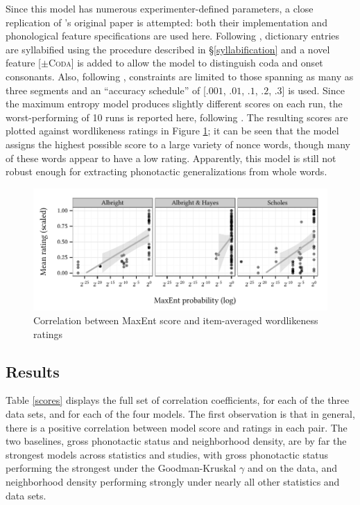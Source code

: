 Since this model has numerous experimenter-defined parameters, a close replication of \citeauthor{Hayes2008a}'s original paper is attempted: both their implementation and phonological feature specifications are used here.
Following \citet{HayesInPress}, dictionary entries are syllabified using the procedure described in \S\ref{syllabification} and a novel feature [$\pm$\textsc{Coda}] is added to allow the model to distinguish coda and onset consonants.
Also, following \citeauthor{Hayes2008a}, constraints are limited to those spanning as many as three segments and an ``accuracy schedule'' of [$.001$, $.01$, $.1$, $.2$, $.3$] is used.
Since the maximum entropy model produces slightly different scores on each run, the worst-performing of 10 runs is reported here, following \citeauthor{Hayes2008a}.
The resulting scores are plotted against wordlikeness ratings in Figure \ref{maxent}; it can be seen that the model assigns the highest possible score to a large variety of nonce words, though many of these words appear to have a low rating. 
Apparently, this model is still not robust enough for extracting phonotactic generalizations from whole words.

\begin{figure}[t]
\centering
\includegraphics{maxent.pdf}
\caption{Correlation between MaxEnt score and item-averaged wordlikeness ratings}
\label{maxent}
\end{figure}

\subsection{Results}

Table \ref{scores} displays the full set of correlation coefficients, for each of the three data sets, and for each of the four models. The first observation is that in general, there is a positive correlation between model score and ratings in each pair. The two baselines, gross phonotactic status and neighborhood density, are by far the strongest models across statistics and studies, with gross phonotactic status performing the strongest under the Goodman-Kruskal $\gamma$ and on the \citet{Albright2007} data, and neighborhood density performing strongly under nearly all other statistics and data sets. 


